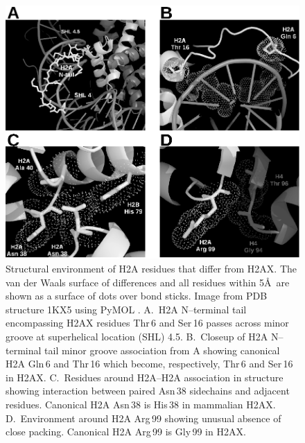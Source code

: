 \documentclass[graybox]{svmult}
\begin{document}
\begin{figure}
\includegraphics{Fig5}
\caption{Structural environment of H2A residues that differ from H2AX\@. The van der Waals surface
of differences and all residues within 5\AA\ are shown as a surface of dots over bond sticks. Image
from PDB structure 1KX5 using PyMOL \protect\cite{DeL02}. A.~H2A N--terminal tail encompassing H2AX
residues Thr\,6 and Ser\,16 passes across minor groove at superhelical location (SHL) 4.5\@. B.~Closeup
of H2A N--terminal tail minor groove association from A showing canonical H2A Gln\,6 and Thr\,16 which
become, respectively, Thr\,6 and Ser\,16 in H2AX\@. C.~Residues around H2A--H2A association in structure
showing interaction between paired Asn\,38 sidechains and adjacent residues. Canonical H2A Asn\,38 is
His\,38 in mammalian H2AX\@. D.~Environment around H2A Arg\,99 showing unusual absence of close packing.
Canonical H2A Arg\,99 is Gly\,99 in H2AX.}
\label{fig:framed}
\end{figure}

\newpage
\end{document}
